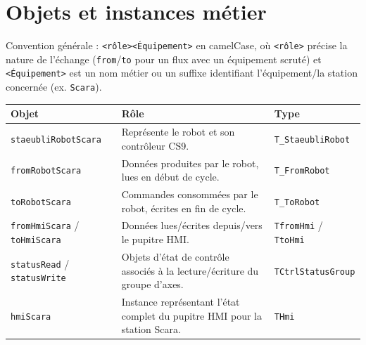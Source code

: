 \section{Objets et instances métier}
\label{secObjetsInstances}

Convention générale : \texttt{<rôle><Équipement>} en camelCase, où \texttt{<rôle>} précise la
nature de l'échange (\texttt{from}/\texttt{to} pour un flux avec un équipement scruté) et
\texttt{<Équipement>} est un nom métier ou un suffixe identifiant l'équipement/la station
concernée (ex. \texttt{Scara}).

\begin{center}
    \begin{tabular}{|p{4.6cm}|p{5.4cm}|p{4.2cm}|}
        \hline
        \textbf{Objet} & \textbf{Rôle} & \textbf{Type} \\
        \hline
        \texttt{staeubliRobotScara} & Représente le robot et son contrôleur CS9. & \texttt{T\_StaeubliRobot} \\
        \hline
        \texttt{fromRobotScara} & Données produites par le robot, lues en début de cycle. & \texttt{T\_FromRobot} \\
        \hline
        \texttt{toRobotScara} & Commandes consommées par le robot, écrites en fin de cycle. & \texttt{T\_ToRobot} \\
        \hline
        \texttt{fromHmiScara} / \texttt{toHmiScara} & Données lues/écrites depuis/vers le pupitre HMI. & \texttt{TfromHmi} / \texttt{TtoHmi} \\
        \hline
        \texttt{statusRead} / \texttt{statusWrite} & Objets d'état de contrôle associés à la lecture/écriture du groupe d'axes. & \texttt{TCtrlStatusGroup} \\
        \hline
        \texttt{hmiScara} & Instance représentant l'état complet du pupitre HMI pour la station Scara. & \texttt{THmi} \\
        \hline
    \end{tabular}
\end{center}


